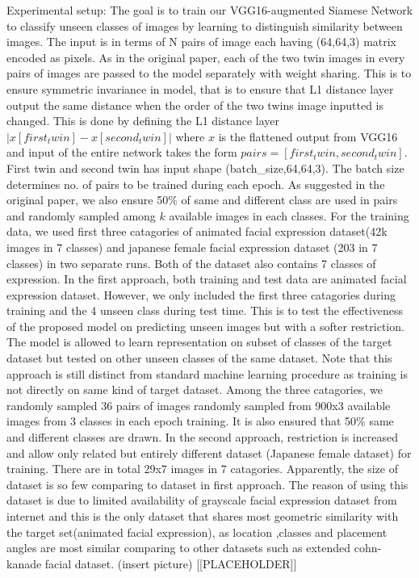 \documentclass{article}
\begin{document}
Experimental setup: The goal is to train our VGG16-augmented Siamese Network to classify unseen classes of images by learning to
distinguish similarity between images. The input is in terms of N pairs of image each having (64,64,3) matrix encoded as pixels.
As in the original paper, each of the two twin images in every pairs of images are passed to the model separately with weight sharing.
This is to ensure symmetric invariance in model, that is to ensure that L1 distance layer output the same distance when the order of the
two twins image inputted is changed. This is done by defining the L1 distance layer $|x[first_twin] - x[second_twin]|$ where $x$ is the
flattened output from VGG16 and input of the entire network takes the form $pairs=[first_twin,second_twin]$. First twin and second twin 
has input shape (batch_size,64,64,3). The batch size determines no. of pairs to be trained during each epoch. As suggested in the 
original paper, we also ensure 50$\%$ of same and different class are used in pairs and randomly sampled among $k$ available images in 
each classes. For the training data, we used first three catagories of animated facial expression dataset(42k images in 7 classes) and 
japanese female facial expression dataset (203 in 7 classes) in two separate runs. Both of the dataset also contains 7 classes of 
expression. 
In the first approach, both training and test data are animated facial expression 
dataset. However, we only included the first three catagories during training and the 4 unseen class during test time. This is to
test the effectiveness of the proposed model on predicting unseen images but with a softer restriction. The model is allowed to learn 
representation on subset of classes of the target dataset but tested on other unseen classes of the same dataset. Note that this 
approach is still distinct from standard machine learning procedure as training is not directly on same kind of target dataset.
Among the three catagories, we randomly sampled 36 pairs of images randomly sampled from 900x3 available images from 3 classes in 
each epoch training. It is also ensured that 50$\%$ same and different classes are drawn.
In the second approach, restriction is increased and allow only related but entirely different dataset (Japanese female dataset) for 
training. There are in total 29x7 images in 7 catagories. Apparently, the size of dataset is so few comparing to dataset in first
approach. The reason of using this dataset is due to limited availability of grayscale facial expression dataset from internet and this
is the only dataset that shares most geometric similarity with the target set(animated facial expression), as location ,classes and
placement angles are most similar comparing to other datasets such as extended cohn-kanade facial dataset.
(insert picture)
[[PLACEHOLDER]]
\end{document}
